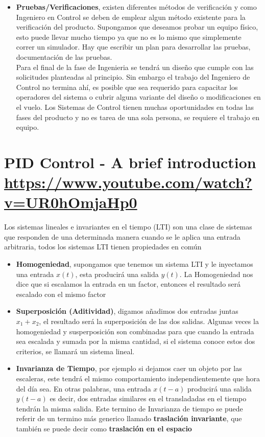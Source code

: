 \documentclass[
	12pt, %
]{fphw}
\begin{document}
\begin{itemize}
\item \textbf{Pruebas/Verificaciones}, existen diferentes métodos de verificación y como Ingeniero en Control se deben de emplear algun método existente para la verificación del producto. Supongamos que deseamos probar un equipo físico, esto puede llevar mucho tiempo ya que no es lo mismo que simplemente correr un simulador. Hay que escribir un plan para desarrollar las pruebas, documentación de las pruebas. \\

  Para el final de la fase de Ingenieria se tendrá un diseño que cumple con las solicitudes planteadas al principio. Sin embargo el trabajo del Ingeniero de Control no termina ahí, es posible que sea requerido para capacitar los operadores del sistema o cubrir alguna variante del diseño o modificaciones en el vuelo. Los Sistemas de Control tienen muchas oportunidades en todas las fases del producto y no es tarea de una sola persona, se requiere el trabajo en equipo.
  
\end{itemize}
\newpage
\section*{{\color{RoyalPurple}PID Control - A brief introduction} \url{https://www.youtube.com/watch?v=UR0hOmjaHp0}}

Los sistemas lineales e invariantes en el tiempo (LTI) son una clase de sistemas que responden de una determinada manera cuando se le aplica una entrada arbitraria, todos los sistemas LTI tienen propiedades en común
\begin{itemize}
\item \textbf{Homogeniedad}, supongamos que tenemos un sistema LTI y le inyectamos una entrada $x(t)$, esta producirá una salida $y(t)$. La Homogeniedad nos dice que si escalamos la entrada en un factor, entonces el resultado será escalado con el mismo factor 
\item \textbf{Superposición (Aditividad)}, digamos añadimos dos entradas juntas $x_{1} + x_{2}$, el resultado será la superposición de las dos salidas. Algunas veces la homogeniedad y susperposición son combinadas para que cuando la entrada sea escalada y sumada por la misma cantidad, si el sistema conoce estos dos criterios, se llamará un sistema lineal.
\item \textbf{Invarianza de Tiempo}, por ejemplo si dejamos caer un objeto por las escaleras, este tendrá el mismo comportamiento independientemente que hora del día sea. En otras palabras, una entrada $x(t-a)$ producirá una salida $y(t-a)$ es decir, dos entradas similares en el transladadas en el tiempo tendrán la misma salida. Este termino de Invarianza de tiempo se puede referir de un termino más generico llamado \textbf{traslación invariante}, que también se puede decir como \textbf{traslación en el espacio}
\end{itemize}
\end{document}
